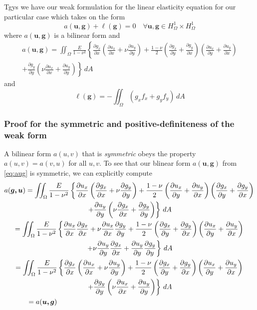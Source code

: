 \documentclass[11pt]{article}
\newcommand\p[2]{\frac{\partial #1}{\partial #2}}
\begin{document}
Tgys we have our weak formulation for the linear elasticity equation for our particular case which takes on the form
\begin{equation} \label{eq:weakForm}
  a(\bm{u,g}) + \ell(\bm{g}) = 0 \quad \forall \bm{u,g} \in H^1_\Omega \times H^1_\Omega
\end{equation}
where $a(\bm{u,g})$ is a bilinear form and
\begin{multline} \label{eq:aug}
  a(\bm{u,g}) =
  \iint_\Omega \frac{E}{1-\nu^2} \left\{
    \p{g_x}{x} \left( \p{u_x}{x} + \nu\p{u_y}{y} \right)
    + \frac{1-\nu}{2} \left( \p{g_x}{y} + \p{g_y}{x} \right)
      \left( \p{u_x}{y} + \p{u_y}{x} \right) \right. \\ \left.
    + \p{g_y}{y} \left(\nu\p{u_x}{x} + \p{u_y}{y} \right)
  \right\} \, dA
\end{multline}
and
\begin{equation} \label{eq:lg}
  \ell(\bm{g}) = - \iint_\Omega \left( g_x f_x + g_y f_y \right) \, dA
\end{equation}

\subsubsection*{Proof for the symmetric and positive-definiteness of the weak form}
A bilinear form $a(u,v)$ that is \emph{symmetric} obeys the property $a(u,v) = a(v,u)$ for all $u,v$. To see that our blinear form $a(\bm{u,g})$ from \eqref{eq:aug} is symmetric, we can explicitly compute
\begin{multline}
  a(\bm{g,u}) =
  \iint_\Omega \frac{E}{1-\nu^2} \left\{
    \p{u_x}{x} \left( \p{g_x}{x} + \nu\p{g_y}{y} \right)
      + \frac{1-\nu}{2} \left( \p{u_x}{y} + \p{u_y}{x} \right)
      \left( \p{g_x}{y} + \p{g_y}{x} \right) \right. \\ \left.
    + \p{u_y}{y} \left(\nu\p{g_x}{x} + \p{g_y}{y} \right)
  \right\} \, dA \\
  = \iint_\Omega \frac{E}{1-\nu^2} \left\{
  \p{u_x}{x} \p{g_x}{x} + \nu \p{u_x}{x} \p{g_y}{y}
  + \frac{1-\nu}{2} \left( \p{g_x}{y} + \p{g_y}{x} \right)
  \left( \p{u_x}{y} + \p{u_y}{x} \right) \right. \\ \left.
  + \nu\p{u_y}{y}\p{g_x}{x} + \p{u_y}{y}\p{g_y}{y}
  \right\} \, dA \\
  =   \iint_\Omega \frac{E}{1-\nu^2} \left\{
  \p{g_x}{x} \left( \p{u_x}{x} + \nu\p{u_y}{y} \right)
  + \frac{1-\nu}{2} \left( \p{g_x}{y} + \p{g_y}{x} \right)
  \left( \p{u_x}{y} + \p{u_y}{x} \right) \right. \\ \left.
  + \p{g_y}{y} \left(\nu\p{u_x}{x} + \p{u_y}{y} \right)
  \right\} \, dA \\
  \hspace{3.5em} = a(\bm{u,g}) \hfill
\end{multline}
\end{document}
